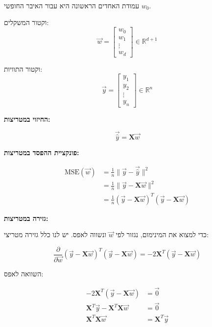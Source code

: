 עמודת האחדים הראשונה היא עבור האיבר החופשי $w_0$.

וקטור המשקלים:
\begin{equation}
\vec{w} = \begin{bmatrix} w_0 \\ w_1 \\ \vdots \\ w_d \end{bmatrix} \in \mathbb{R}^{d+1}
\end{equation}

וקטור התוויות:
\begin{equation}
\vec{y} = \begin{bmatrix} y_1 \\ y_2 \\ \vdots \\ y_n \end{bmatrix} \in \mathbb{R}^{n}
\end{equation}

\textbf{החיזוי במטריצות:}

\begin{equation}
\vec{\hat{y}} = \mathbf{X}\vec{w}
\end{equation}

\textbf{פונקציית ההפסד במטריצות:}

\begin{align}
\text{MSE}(\vec{w}) &= \frac{1}{n} \|\vec{y} - \vec{\hat{y}}\|^2 \nonumber \\
&= \frac{1}{n} \|\vec{y} - \mathbf{X}\vec{w}\|^2 \nonumber \\
&= \frac{1}{n} (\vec{y} - \mathbf{X}\vec{w})^T(\vec{y} - \mathbf{X}\vec{w})
\end{align}

\textbf{גזירה במטריצות:}

כדי למצוא את המינימום, נגזור לפי $\vec{w}$ ונשווה לאפס. יש לנו כלל גזירה מטריצי:

\begin{equation}
\frac{\partial}{\partial \vec{w}} (\vec{y} - \mathbf{X}\vec{w})^T(\vec{y} - \mathbf{X}\vec{w}) = -2\mathbf{X}^T(\vec{y} - \mathbf{X}\vec{w})
\end{equation}

השוואה לאפס:

\begin{align}
-2\mathbf{X}^T(\vec{y} - \mathbf{X}\vec{w}) &= \vec{0} \nonumber \\
\mathbf{X}^T\vec{y} - \mathbf{X}^T\mathbf{X}\vec{w} &= \vec{0} \nonumber \\
\mathbf{X}^T\mathbf{X}\vec{w} &= \mathbf{X}^T\vec{y}
\end{align}


